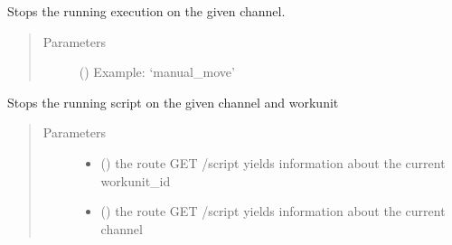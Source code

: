 \documentclass[letterpaper,10pt,english,openany,oneside]{sphinxmanual}
\begin{document}
\begin{fulllineitems}

\begin{fulllineitems}
\label{\detokenize{_modules/AconitySTUDIO_client:AconitySTUDIO_client.AconitySTUDIO_client.stop_channel}}
Stops the running execution on the given channel.
\begin{quote}\begin{description}
\item[{Parameters}] \leavevmode
{} () \textendash{} Example: ‘manual\_move’

\end{description}\end{quote}

\end{fulllineitems}


\begin{fulllineitems}
\label{\detokenize{_modules/AconitySTUDIO_client:AconitySTUDIO_client.AconitySTUDIO_client.stop_job}}
Stops the running script on the given channel and workunit
\begin{quote}\begin{description}
\item[{Parameters}] \leavevmode\begin{itemize}
\item {} 
 () \textendash{} the route GET /script yields information about the current workunit\_id

\item {} 
 () \textendash{} the route GET /script yields information about the current channel

\end{itemize}


\end{description}
\end{quote}
\end{fulllineitems}
\end{fulllineitems}
\end{document}
